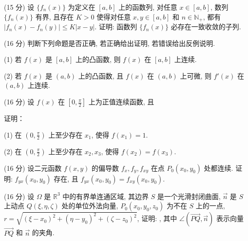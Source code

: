 (15 分) 设 $\{f_n(x)\}$ 为定义在 $[a, b]$ 上的函数列, 对任意 $x \in [a, b]$, 数列 $\{f_n(x)\}$ 有界, 且存在 $K > 0$ 使得对任意 $x, y \in [a, b]$ 和 $n \in \mathbb{N}_+$, 都有 $|f_n(x) - f_n(y)| \leq K|x - y|$. 证明: 函数列 $\{f_n(x)\}$ 必存在一致收敛的子列.\par
(16 分) 判断下列命题是否正确, 若正确给出证明, 若错误给出反例说明.\par
(1) 若 $f(x)$ 是 $[a, b]$ 上的凸函数, 则 $f(x)$ 在 $[a, b]$ 上连续.\par
(2) 若 $f(x)$ 是 $(a, b)$ 上的凸函数, 且 $f(x)$ 在 $(a, b)$ 上可微, 则 $f'(x)$ 在 $(a, b)$ 上连续.\par
\par{}
(16 分) 设 $f(x)$ 在 $\left[0, \frac{\pi}{2}\right]$ 上为正值连续函数, 且\par
\nopagebreak[4]
证明：\par
(1) 在 $\left(0, \frac{\pi}{2}\right)$ 上至少存在 $x_{1}$, 使得 $f(x_{1}) = 1$.\par
(2) 在 $\left(0, \frac{\pi}{2}\right)$ 上至少存在 $x_{2}, x_{3}$, 使得 $f(x_{2}) = f(x_{3})$.\par
(16 分) 设二元函数 $f(x, y)$ 的偏导数 $f_x, f_y, f_{xy}$ 在点 $P_0(x_0, y_0)$ 处都连续. 证明: $f_{yx}(x_0, y_0)$ 存在, 且 $f_{yx}(x_0, y_0) = f_{xy}(x_0, y_0)$.\par
(16 分) 设 $\Omega$ 是 $\mathbb{R}^3$ 中的有界单连通区域, 其边界 $S$ 是一个光滑封闭曲面, $\vec{n}$ 是 $S$ 上动点 $Q(\xi, \eta, \zeta)$ 处的单位外法向量, $P_0(x_0, y_0, z_0)$ 为不在 $S$ 上的一点, $r = \sqrt{(\xi - x_0)^2 + (\eta - y_0)^2 + (\zeta - z_0)^2}$, 证明: , 其中 $\angle (\overrightarrow{PQ}, \overrightarrow{n})$ 表示向量 $\overrightarrow{PQ}$ 和 $\overrightarrow{n}$ 的夹角.\par
